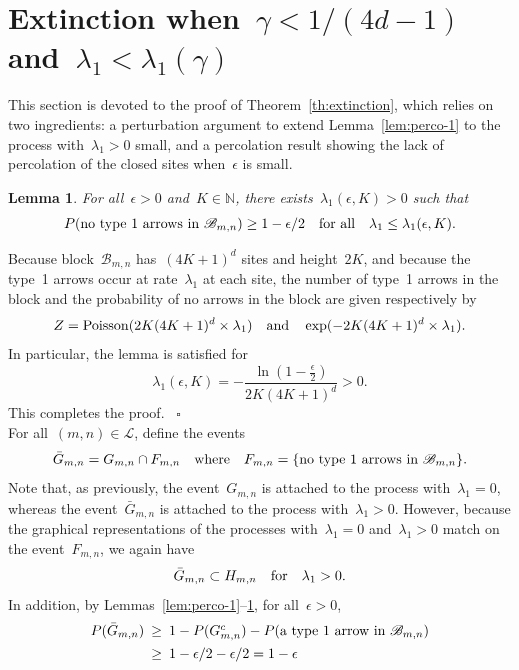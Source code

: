 \documentclass[letterpaper,11pt,twoside,keywordsasfootnote,addressatend,noinfoline]{article}
\newtheorem{lemma}[theorem]{Lemma}
\newenvironment{proof}{\noindent{\bf Proof.}}{\hspace*{2mm}~$\square$}
\newcommand{\N}{\mathbb{N}}
\newcommand{\B}{\mathscr{B}}
\newcommand{\Lat}{\mathscr{L}}
\newcommand{\ep}{\epsilon}
\newcommand{\n}{\hspace*{-5pt}}
\DeclareMathOperator{\poisson}{Poisson}
\begin{document}
\section{Extinction when~$\gamma < 1 / (4d - 1)$ and~$\lambda_1 < \lambda_1 (\gamma)$}
\label{sec:extinction}
 This section is devoted to the proof of Theorem~\ref{th:extinction}, which relies on two ingredients:
 a perturbation argument to extend Lemma~\ref{lem:perco-1} to the process with~$\lambda_1 > 0$ small, and a percolation result showing the lack of percolation of the closed sites when~$\ep$ is small.
\begin{lemma}
\label{lem:perturbation}
 For all~$\ep > 0$ and~$K \in \N$, there exists~$\lambda_1 (\ep, K) > 0$ such that
 $$ P (\hbox{no type~1 arrows in} \ \B_{m, n}) \geq 1 - \ep / 2 \quad \hbox{for all} \quad \lambda_1 \leq \lambda_1 (\ep, K). $$
\end{lemma}
\begin{proof}
 Because block~$\B_{m, n}$ has~$(4K + 1)^d$ sites and height~$2K$, and because the type~1 arrows occur at rate~$\lambda_1$ at each site, the number of type~1 arrows in the block and the probability of no arrows in the block are given respectively by
 $$ Z = \poisson (2K (4K + 1)^d \times \lambda_1) \quad \hbox{and} \quad \exp (- 2K (4K + 1)^d \times \lambda_1). $$
 In particular, the lemma is satisfied for
 $$ \lambda_1 (\ep, K)  = - \frac{\ln (1 - \frac{\ep}{2})}{2K (4K + 1)^d} > 0. $$
 This completes the proof.
\end{proof} \vspace*{8pt} \\
 For all~$(m, n) \in \Lat$, define the events
 $$ \bar G_{m, n} = G_{m, n} \cap F_{m, n} \quad \hbox{where} \quad F_{m, n} = \{\hbox{no type~1 arrows in} \ \B_{m, n} \}. $$
 Note that, as previously, the event~$G_{m, n}$ is attached to the process with~$\lambda_1 = 0$, whereas the event~$\bar G_{m, n}$ is attached to the process with~$\lambda_1 > 0$.
 However, because the graphical representations of the processes with~$\lambda_1 = 0$ and~$\lambda_1 > 0$ match on the event~$F_{m, n}$, we again have
\begin{equation}
\label{eq:perturbation-1}
\bar G_{m, n} \subset H_{m ,n} \quad \hbox{for} \quad \lambda_1 > 0.
\end{equation}
 In addition, by Lemmas~\ref{lem:perco-1}--\ref{lem:perturbation}, for all~$\ep > 0$,
\begin{equation}
\label{eq:perturbation-2}
\begin{array}{rcl}
  P (\bar G_{m, n}) & \n \geq \n & 1 - P (G_{m, n}^c) - P (\hbox{a type~1 arrow in} \ \B_{m, n}) \vspace*{4pt} \\
                    & \n \geq \n & 1 - \ep / 2 - \ep / 2 = 1 - \ep \end{array}
\end{equation}
\end{document}

